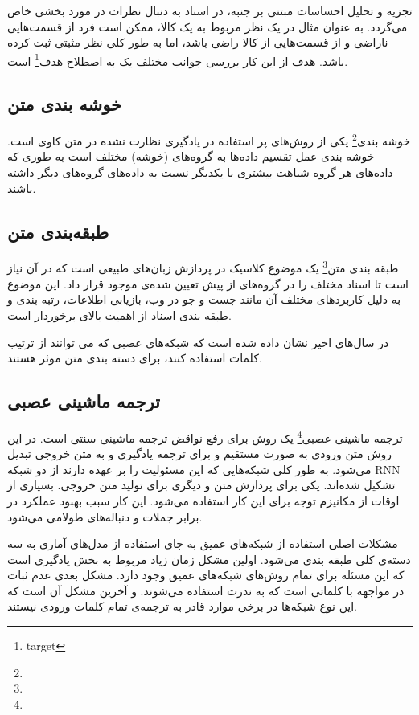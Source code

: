 \documentclass[12pt, a4paper, oneside]{report}
\begin{document}
تجزیه و تحلیل احساسات مبتنی بر جنبه، در اسناد به دنبال نظرات در مورد بخشی خاص می‌گردد. به عنوان مثال در یک نظر
مربوط به یک کالا، ممکن است فرد از قسمت‌هایی ناراضی و از قسمت‌هایی از کالا راضی باشد، اما به طور کلی نظر مثبتی
ثبت کرده باشد. هدف از این کار بررسی جوانب مختلف یک به اصطلاح
هدف\footnote{target}
است.
\cite{zhang2018deep}

\subsection{خوشه بندی متن}

خوشه بندی\footnote{}
یکی از روش‌های پر استفاده در یادگیری نظارت نشده در متن کاوی است. خوشه بندی عمل تقسیم داده‌ها به گروه‌های
(خوشه)
مختلف است به طوری که داده‌های هر گروه شباهت بیشتری با یکدیگر نسبت به داده‌های گروه‌های دیگر داشته باشند\cite{DBLP:journals/corr/AllahyariPASTGK17a}.


\subsection{طبقه‌بندی متن}

طبقه بندی متن\footnote{}
یک موضوع کلاسیک در پردازش زبان‌های طبیعی است که در آن نیاز است تا اسناد مختلف را در گروه‌های
از پیش تعیین شده‌ی موجود قرار داد\cite{c9d4fbeac7324056bed5d1cb262a7268}.
این موضوع به دلیل کاربرد‌های مختلف آن مانند جست و جو در وب، بازیابی اطلاعات،
رتبه بندی و طبقه بندی اسناد از اهمیت بالای برخوردار است\cite{joulin2016fasttext}.

در سال‌های اخیر نشان داده شده است که شبکه‌های عصبی که می توانند از ترتیب کلمات استفاده کنند،
برای دسته بندی متن موثر هستند\cite{iyyer-etal-2015-deep}.

\subsection{ترجمه ماشینی عصبی}
ترجمه ماشینی عصبی\footnote{}
یک روش برای رفع نواقض ترجمه ماشینی سنتی است. در این روش متن ورودی به صورت مستقیم و
برای ترجمه یادگیری و به متن خروجی تبدیل می‌شود.
به طور کلی شبکه‌هایی که این مسئولیت را بر عهده دارند از دو شبکه
RNN
تشکیل شده‌اند. یکی برای پردازش متن و دیگری برای تولید متن خروجی.
بسیاری از اوقات از مکانیزم توجه برای این کار استفاده می‌شود.
این کار سبب بهبود عملکرد در برابر جملات و دنباله‌های طولامی می‌شود.

مشکلات اصلی استفاده از شبکه‌های عمیق به جای استفاده از مدل‌های آماری به سه دسته‌ی کلی طبقه بندی می‌شود.
اولین مشکل زمان زیاد مربوط به بخش یادگیری است که این مسئله برای تمام روش‌های شبکه‌های عمیق وجود دارد.
مشکل بعدی عدم ثبات در مواجهه با کلماتی است که به ندرت استفاده می‌شوند.
و آخرین مشکل آن است که این نوع شبکه‌ها در برخی موارد قادر به ترجمه‌ی تمام کلمات ورودی نیستند.\cite{wu2016google}
\end{document}
